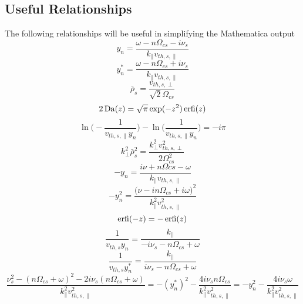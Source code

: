 \subsection{Useful Relationships}  %
The following relationships will be useful in simplifying the Mathematica output
\begin{equation}
	y_n = \frac{\omega - n \Omega_{cs}- i \nu_s}{k_\parallel v_{th,s,\parallel}}
	\label{eq:a_yn}
\end{equation}
\begin{equation}
	y_n^* = \frac{\omega - n \Omega_{cs}+ i \nu_s}{k_\parallel v_{th,s,\parallel}}
	\label{eq:a_ynstar}
\end{equation}
\begin{equation}
	\bar{\rho}_s = \frac{v_{th,s,\perp}}{\sqrt{2} \Omega_{cs}}
	\label{eq:a_rho}
\end{equation}
\begin{equation}
	2 \operatorname{Da}(z) = \sqrt{\pi} \exp(-z^2) \operatorname{erfi}(z)
	\label{eq:a_Daw}
\end{equation}
\begin{equation}
	\ln\bigg( -\frac{1}{v_{th,s,\parallel}y_n} \bigg) - \ln\bigg( \frac{1}{v_{th,s,\parallel}y_n} \bigg) = -i \pi
	\label{eq:a_ln}
\end{equation}
\begin{equation}
	k_\perp^2 \bar{\rho}_s^2 = \frac{k_\perp^2 v_{th,s,\perp}^2}{2\Omega_{cs}^2}
	\label{eq:a_k2rho2}
\end{equation}
\begin{equation}
	-y_n = \frac{i\nu + n\Omega{cs}-\omega}{k_\parallel v_{th,s,\parallel}}
	\label{eq:a_-yn}
\end{equation}
\begin{equation}
	-y_n^2 = \frac{\big(\nu-in\Omega_{cs}+i\omega\big)^2}{k_\parallel^2 v_{th,s,\parallel}^2}
	\label{eq:a_-yn2}
\end{equation}
\begin{equation}
	\operatorname{erfi}(-z) = -\operatorname{erfi}(z) 
	\label{eq:a_erfi_odd}
\end{equation}
\begin{equation}
	\frac{1}{v_{th,s}y_n} = \frac{k_\parallel}{-i\nu_s-n\Omega_{cs}+\omega}
	\label{eq:a_vthyn}
\end{equation}
\begin{equation}
	\frac{1}{v_{th,s}y_n^*} = \frac{k_\parallel}{i\nu_s-n\Omega_{cs}+\omega}
	\label{eq:a_vthynstar}
\end{equation}
\begin{equation}
	\frac{\nu_s^2-(n\Omega_{cs}+\omega)^2-2 i \nu_s (n\Omega_{cs}+ \omega)}{k_\parallel^2 v_{th,s,\parallel}^2} = 
	-(y_n^*)^2 - \frac{4 i \nu_s n \Omega_{cs}}{k_\parallel^2 v_{th,s,\parallel}^2}
	= - y_n^2 - \frac{4 i \nu_s \omega}{k_\parallel^2 v_{th,s,\parallel}^2}  
	\label{eq:a_ynstar_plus}
\end{equation}
